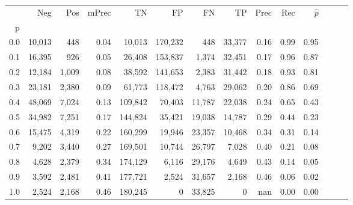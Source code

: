 \begin{tabular}{rrrrrrrrrrrrrr}
\toprule
{} &     Neg &    Pos & mPrec &       TN &       FP &      FN &      TP &  Prec &   Rec & $\hat{p}$ \\
p   &         &        &       &          &          &         &         &       &       &           \\
\midrule
0.0 &  10,013 &    448 &  0.04 &   10,013 &  170,232 &     448 &  33,377 &  0.16 &  0.99 &      0.95 \\
0.1 &  16,395 &    926 &  0.05 &   26,408 &  153,837 &   1,374 &  32,451 &  0.17 &  0.96 &      0.87 \\
0.2 &  12,184 &  1,009 &  0.08 &   38,592 &  141,653 &   2,383 &  31,442 &  0.18 &  0.93 &      0.81 \\
0.3 &  23,181 &  2,380 &  0.09 &   61,773 &  118,472 &   4,763 &  29,062 &  0.20 &  0.86 &      0.69 \\
0.4 &  48,069 &  7,024 &  0.13 &  109,842 &   70,403 &  11,787 &  22,038 &  0.24 &  0.65 &      0.43 \\
0.5 &  34,982 &  7,251 &  0.17 &  144,824 &   35,421 &  19,038 &  14,787 &  0.29 &  0.44 &      0.23 \\
0.6 &  15,475 &  4,319 &  0.22 &  160,299 &   19,946 &  23,357 &  10,468 &  0.34 &  0.31 &      0.14 \\
0.7 &   9,202 &  3,440 &  0.27 &  169,501 &   10,744 &  26,797 &   7,028 &  0.40 &  0.21 &      0.08 \\
0.8 &   4,628 &  2,379 &  0.34 &  174,129 &    6,116 &  29,176 &   4,649 &  0.43 &  0.14 &      0.05 \\
0.9 &   3,592 &  2,481 &  0.41 &  177,721 &    2,524 &  31,657 &   2,168 &  0.46 &  0.06 &      0.02 \\
1.0 &   2,524 &  2,168 &  0.46 &  180,245 &        0 &  33,825 &       0 &   nan &  0.00 &      0.00 \\
\bottomrule
\end{tabular}
